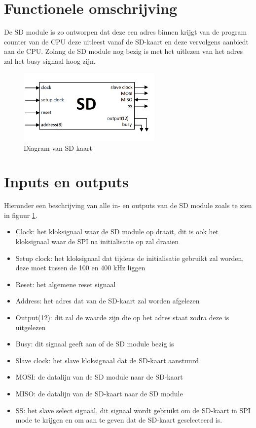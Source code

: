 \documentclass[oneside,dutch]{tudelft-report}
\begin{document}
\section{Functionele omschrijving}
De SD module is zo ontworpen dat deze een adres binnen krijgt van de program counter van de CPU deze uitleest vanaf de SD-kaart en deze vervolgens aanbiedt aan de CPU. Zolang de SD module nog bezig is met het uitlezen van het adres zal het busy signaal hoog zijn.

\begin{figure}[H]
\center
\includegraphics[width=7cm]{./sd_diagram}
\caption{Diagram van SD-kaart}
\label{sd-diagram}
\end{figure}

\newpage

\section{Inputs en outputs}
Hieronder een beschrijving van alle in- en outputs van de SD module zoals te zien in figuur \ref{sd-diagram}.

\begin{itemize}
\item Clock: het kloksignaal waar de SD module op draait, dit is ook het kloksignaal waar de SPI na initialisatie op zal draaien
\item Setup clock: het kloksignaal dat tijdens de initialisatie gebruikt zal worden, deze moet tussen de 100 en 400 kHz liggen
\item Reset: het algemene reset signaal 
\item Address: het adres dat van de SD-kaart zal worden afgelezen
\item Output(12): dit zal de waarde zijn die op het adres staat zodra deze is uitgelezen
\item Busy: dit signaal geeft aan of de SD module bezig is
\item Slave clock: het slave kloksignaal dat de SD-kaart aanstuurd
\item MOSI: de datalijn van de SD module naar de SD-kaart
\item MISO: de datalijn van de SD-kaart naar de SD module
\item SS: het slave select signaal, dit signaal wordt gebruikt om de SD-kaart in SPI mode te krijgen en om aan te geven dat de SD-kaart geselecteerd is.
\end{itemize}
\end{document}
